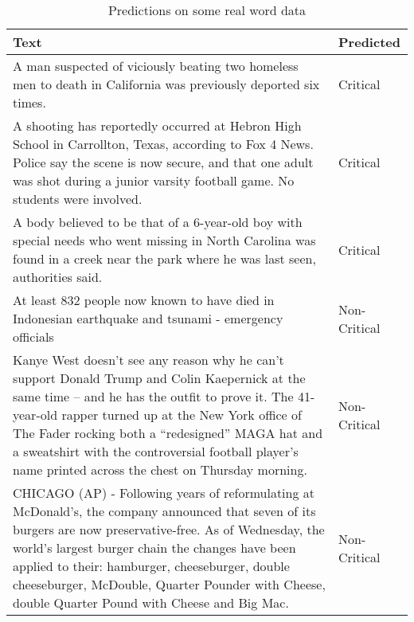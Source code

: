 \begin{table}
\begin{center}
\caption{Predictions on some real word data}
\label{tbl:real_prediction}
\begin{tabular}{p{12cm}p{2cm}}
\toprule 
Text&Predicted\\
\midrule 
A man suspected of viciously beating two homeless men to death in California was previously deported six times. &Critical \\
\hline
A shooting has reportedly occurred at Hebron High School in Carrollton, Texas, according to Fox 4 News.  Police say the scene is now secure, and that one adult was shot during a junior varsity football game. No students were involved. &Critical \\
\hline
A body believed to be that of a 6-year-old boy with special needs who went missing in North Carolina was found in a creek near the park where he was last seen, authorities said.&Critical \\
\hline
At least 832 people now known to have died in Indonesian earthquake and tsunami - emergency officials &Non-Critical \\
\hline
Kanye West doesn’t see any reason why he can’t support Donald Trump and Colin Kaepernick at the same time – and he has the outfit to prove it.  The 41-year-old rapper turned up at the New York office of The Fader rocking both a “redesigned” MAGA hat and a sweatshirt with the controversial football player’s name printed across the chest on Thursday morning.&Non-Critical \\
\hline
CHICAGO (AP) - Following years of reformulating at McDonald's, the company announced that seven of its burgers are now preservative-free. As of Wednesday, the world's largest burger chain the changes have been applied to their: hamburger, cheeseburger, double cheeseburger, McDouble, Quarter Pounder with Cheese, double Quarter Pound with Cheese and Big Mac. &Non-Critical \\
\bottomrule
\end{tabular}
\end{center}
\end{table}